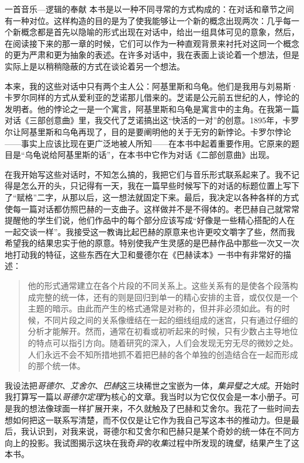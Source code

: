 \begin{intro}{一首音乐—逻辑的奉献}
本书是以一种不同寻常的方式构成的：在对话和章节之间有一种对位。这样构造的目的是为了使我能够让一个新的概念出现两次：几乎每一个新概念都是首先以隐喻的形式出现在对话中，给出一组具体可见的意象，然后，在阅读接下来的那一章的时候，它们可以作为一种直观背景来衬托对这同一个概念的更为严肃和更为抽象的表述。在许多对话中，我在表面上谈论着一个想法，但是实际上是以稍稍隐蔽的方式在谈论着另一个想法。

本来，我的这些对话中只有两个主人公：阿基里斯和乌龟。他们是我用与刘易斯·卡罗尔同样的方式从爱利亚的芝诺那儿借来的。芝诺是公元前五世纪的人，悖论的发明者。他的悖论之一是一个寓言，阿基里斯和乌龟是寓言中的主角。在我第一篇对话《三部创意曲》里，我交代了芝诺搞出这“快活的一对”的创意。1895年，卡罗尔让阿基里斯和乌龟再现了，目的是要阐明他的关于无穷的新悖论。卡罗尔悖论——事实上应该比现在更广泛地被人所知——在本书中起着重要作用。它原来的题目是“乌龟说给阿基里斯的话”，在本书中它作为对话《二部创意曲》出现。

在我开始写这些对话时，不知怎么搞的，我把它们与音乐形式联系起来了。我不记得是怎么开的头，只记得有一天，我在一篇早些时候写下的对话的标题位置上写下了“赋格”二字，从那以后，这一想法就固定下来。最后，我决定以各种各样的方式使每一篇对话都仿照巴赫的一支曲子。这样做并不是不得体的。老巴赫自己就常常提醒他的学生们说，他们作品中的每个部分应该写成“好像是一些精心搭配的人在一起交谈一样”。我接受这一教诲比起巴赫的原意来也许更咬文嚼字了些，然而我希望我的结果忠实于他的原意。特别使我产生灵感的是巴赫作品中那些一次又一次地打动我的特征，这些东西在大卫和曼德尔在《巴赫读本》一书中有非常好的描述：

\begin{quote}
他的形式通常建立在各个片段的不同关系上。这些关系有的是使各个段落构成完整的统一体，还有的则是回归到单一的精心安排的主音，或仅仅是一个主题的暗示。由此而产生的格式通常是对称的，但并非必须如此。有的时候，不同片段之间的关系像缠结在一起的细线组成的迷宫，只有通过仔细的分析才能解开。然而，通常在初看或初听起来的时候，只有少数占主导地位的特点可以指引方向。随着研究的深入，人们会发现无穷无尽的微妙之处。人们永远不会不知所措地抓不着把巴赫的各个单独的创造结合在一起而形成的那个统一体。
\end{quote}

我设法把\emph{哥德尔}、\emph{艾舍尔}、\emph{巴赫}这三块稀世之宝嵌为一体，\emph{集异璧之大成}。开始时我打算写一篇以\emph{哥德尔定理}为核心的文章。我当时以为它仅仅会是一本小册子。可是我的想法像球面一样扩展开来，不久就触及了巴赫和艾舍尔。我花了一些时间去想如何把这一联系写清楚，而不仅仅是让它作为我自己写这本书的推动力。但是最后，我认识到，对我来说，哥德尔和艾舍尔和巴赫只是某个奇妙的统一体在不同方向上的投影。我试图揭示这块在我奇\emph{异}的收\emph{集}过程中所发现的瑰\emph{璧}，结果产生了这本书。

\end{intro}
